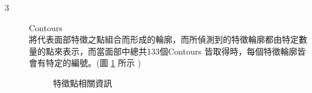 \documentclass[12pt]{article}  %
\theoremstyle{plain}
\begin{document}
\begin{itemize}
\begin{description}
\item[3] Contours \\
將代表面部特徵之點組合而形成的輪廓，而所偵測到的特徵輪廓都由特定數量的點來表示，而當面部中總共133個Contours 皆取得時，每個特徵輪廓皆會有特定的編號。(圖 \ref{特徵點相關資訊} 所示 )
\begin{figure}[htbp]
\quad
{}
\caption{特徵點相關資訊} \label{特徵點相關資訊}
\end{figure}
\end{description}


\end{itemize}
\end{document}
